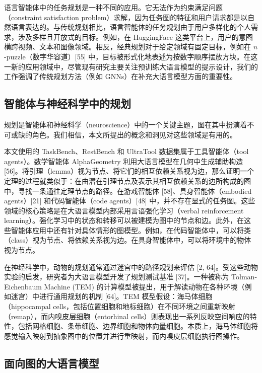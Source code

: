 \documentclass[11pt,UTF8,fontset=fandol]{ctexart}
\begin{document}
语言智能体中的任务规划是一种不同的应用。它无法作为约束满足问题（constraint satisfaction problem）求解，因为任务图的特征和用户请求都是以自然语言表达的。与传统规划相比，语言智能体的任务规划由于用户多样化的个人需求，涉及多样且开放式的目标。例如，在 HuggingFace 这类平台上，用户的意图横跨视频、文本和图像领域。相反，经典规划对于给定领域有固定目标，例如在 $n$-puzzle（数字华容道）[55] 中，目标被形式化地表述为按数字顺序摆放方块。在这一新的应用领域中，尽管现有研究主要关注预训练大语言模型的提示设计，我们的工作强调了传统规划方法（例如 GNNs）在补充大语言模型方面的重要性。

\subsection{智能体与神经科学中的规划}

规划是智能体和神经科学（neuroscience）中的一个关键主题，图在其中扮演着不可或缺的角色。我们相信，本文所提出的概念和洞见对这些领域是有用的。

本文使用的 TaskBench、RestBench 和 UltraTool 数据集属于工具智能体（tool agents）。数学智能体 AlphaGeometry 利用大语言模型在几何中生成辅助构造 [56]。将引理（lemma）视为节点、将它们的相互依赖关系视为边，那么证明一个定理的过程就类似于：在由潜在引理节点及表示其相互依赖关系的边所构成的图中，寻找一条通往定理节点的路径。在游戏智能体 [58]、具身智能体（embodied agents）[21] 和代码智能体（code agents）[48] 中，并不存在显式的任务图。这些领域的核心策略是在大语言模型内部采用言语强化学习（verbal reinforcement learning）。强化学习中的状态和转移可以被建模为图中的节点和边。此外，在这些智能体应用中还有针对具体情形的图模型。例如，在代码智能体中，可以将类（class）视为节点、将依赖关系视为边。在具身智能体中，可以将环境中的物体视为节点。

在神经科学中，动物的规划通常通过迷宫中的路径规划来评估 [2, 64]。受这些动物实验的启发，研究者为大语言模型开发了规划测试基准 [37]。一种被称为 Tolman-Eichenbaum Machine (TEM) 的计算模型被提出，用于解读动物在各种环境（例如迷宫）中进行通用规划的机制 [64]。TEM 模型假设：海马体细胞（hippocampal cells，包括位置细胞和地标细胞）在不同环境之间重新映射（remap），而内嗅皮层细胞（entorhinal cells）则表现出一系列反映空间响应的特性，包括网格细胞、条带细胞、边界细胞和物体向量细胞。本质上，海马体细胞将感觉输入映射到抽象图中的位置并进行重映射，而内嗅皮层细胞执行图操作。

\subsection{面向图的大语言模型}
\end{document}
